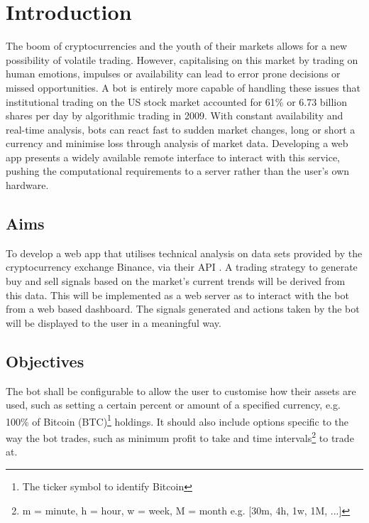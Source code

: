 
\chapter{Introduction}
\label{sec:intro}


The boom of cryptocurrencies and the youth of their markets allows for a new possibility of volatile trading. However, capitalising on this market by trading on human emotions, impulses or availability can lead to error prone decisions or missed opportunities. A bot is entirely more capable of handling these issues that institutional trading on the US stock market accounted for 61\% or 6.73 billion shares \cite{WEB:Cheng:2017} per day by algorithmic trading in 2009. With constant availability and real-time analysis, bots can react fast to sudden market changes, long or short a currency and minimise loss through analysis of market data. Developing a web app presents a widely available remote interface to interact with this service, pushing the computational requirements to a server rather than the user's own hardware.






\section{Aims}
\label{sec:intro:aims}
\noindent To develop a web app that utilises technical analysis on data sets provided by the cryptocurrency exchange Binance, via their API \cite{WEB:BINANCE_API:2018}. A trading strategy to generate buy and sell signals based on the market's current trends will be derived from this data. This will be implemented as a web server as to interact with the bot from a web based dashboard. The signals generated and actions taken by the bot will be displayed to the user in a meaningful way.


\section{Objectives}
\label{sec:intro:objectives}
\noindent The bot shall be configurable to allow the user to customise how their assets are used, such as setting a certain percent or amount of a specified currency, e.g. 100\% of Bitcoin (BTC)\footnote{The ticker symbol to identify Bitcoin} holdings. It should also include options specific to the way the bot trades, such as minimum profit to take and time intervals\footnote{m = minute, h = hour, w = week, M = month e.g. [30m, 4h, 1w, 1M, ...]} to trade at.

